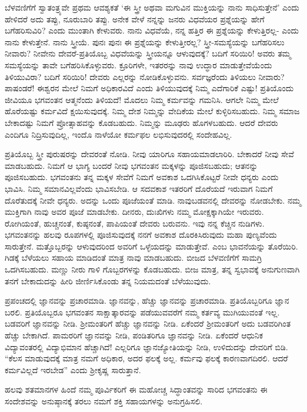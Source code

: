 ಬೆಳವಣಿಗೆಗೆ ಸ್ವಾತಂತ್ರ್ಯವೇ ಪ್ರಥಮ ಆವಶ್ಯಕತೆ ‘ಈ ಸ್ತ್ರೀ ಅಥವಾ ಮಗುವಿನ ಮುಕ್ತಿಯನ್ನು ನಾನು ಸಾಧಿಸುತ್ತೇನೆ’ ಎಂದು ಹೇಳಿದರೆ ಅದು ತಪ್ಪು, ನೂರುಬಾರಿ ತಪ್ಪು. ಅನೇಕ ವೇಳೆ ನನ್ನನ್ನು ಜನರು ವಿಧವೆಯರ ಪ್ರಶ್ನೆಯನ್ನು ಹೇಗೆ ಬಗೆಹರಿಸುವಿರಿ? ಎಂದು ಮುಂತಾಗಿ ಕೇಳುವರು. ನಾನು ವಿಧವೆಯೆ, ನನ್ನ ಹತ್ತಿರ ಈ ಪ್ರಶ್ನೆಯನ್ನು ಕೇಳುತ್ತಿರಲ್ಲ- ಎಂದು ನಾನು ಕೇಳುತ್ತೇನೆ. ನಾನು ಸ್ತ್ರೀಯೆ. ಪುನಃ ಪುನಃ ಈ ಪ್ರಶ್ನೆಯನ್ನು ಕೇಳುತ್ತೀರಲ್ಲ? ಸ್ತ್ರೀ-ಸಮಸ್ಯೆಯನ್ನು ಬಗೆಹರಿಸಲು ನೀವಾರು? ನೀವೇನು ದೇವರೆ-ಪ್ರತಿಯೊಬ್ಬ ವಿಧವೆಯನ್ನು ಸ್ತ್ರೀಯನ್ನೂ ಆಳುವುದಕ್ಕೆ? ಬದಿಗೆ ಸರಿಯಿರಿ! ಅವರು ತಮ್ಮ ಸಮಸ್ಯೆಯನ್ನು ತಾವೇ ಬಗೆಹರಿಸಿಕೊಳ್ಳುವರು. ಕ್ರೂರಿಗಳೇ, ಇತರರನ್ನು ನಾವು ಉದ್ಧಾರ ಮಾಡುತ್ತೇವೆಯೆಂದು ತಿಳಿಯುವಿರಾ? ಬದಿಗೆ ಸರಿಯಿರಿ! ದೇವರು ಎಲ್ಲರನ್ನು ನೋಡಿಕೊಳ್ಳುವನು. ಸರ್ವಜ್ಞರೆಂದು ತಿಳಿಯಲು ನೀವಾರು? ಪಾಷಂಡರೆ! ಈಶ್ವರನ ಮೇಲೆ ನಿಮಗೆ ಅಧಿಕಾರವಿದೆ ಎಂದು ತಿಳಿಯುವುದಕ್ಕೆ ನಿಮ್ಮ ಎದೆಗಾರಿಕೆ ಎಷ್ಟು! ಪ್ರತಿಯೊಂದು ಜೀವಿಯೂ ಭಗವಂತನ ಆತ್ಮನೆಂದು ತಿಳಿಯದೆ! ಮೊದಲು ನಿಮ್ಮ ಕರ್ಮವನ್ನು ಗಮನಿಸಿ. ಆಗಲೇ ನಿಮ್ಮ ಮೇಲೆ ಹೊರೆಯಷ್ಟು ಕರ್ಮವಿದೆ ಕ್ಷಯಿಸುವುದಕ್ಕೆ. ನಿಮ್ಮ ದೇಶ ನಿಮ್ಮನ್ನು ವೇದಿಕೆಯ ಮೇಲೆ ಕುಳ್ಳಿರಿಸಬಹುದು. ನಿಮ್ಮ ಸಮಾಜ ಬೇಕಾದಷ್ಟು ನಿಮಗೆ ಪ್ರೋತ್ಸಾಹವನ್ನು ಕೊಡಬಹುದು. ನಿಮ್ಮನ್ನು ಮೂಢರು ಹೊಗಳಬಹುದು. ಆದರೆ ದೇವರು ಎಂದಿಗೂ ನಿದ್ರಿಸುವುದಿಲ್ಲ, ಇಂದೊ ನಾಳೆಯೋ ಕರ್ಮಫಲ ಲಭಿಸುವುದರಲ್ಲಿ ಸಂದೇಹವಿಲ್ಲ.

ಪ್ರತಿಯೊಬ್ಬ ಸ್ತ್ರೀ ಪುರುಷರನ್ನು ದೇವರಂತೆ ನೋಡಿ. ನೀವು ಯಾರಿಗೂ ಸಹಾಯಮಾಡಲಾರಿರಿ. ಬೇಕಾದರೆ ನೀವು ಸೇವೆ ಮಾಡಬಹುದು. ನಿಮಗೆ ಆ ಭಾಗ್ಯ ಬಂದರೆ ನೀವು ಭಗವಂತನ ಮಕ್ಕಳನ್ನು ಪೂಜಿಸಬಹುದು; ಆತನನ್ನು ಪೂಜಿಸಬಹುದು. ಭಗವಂತನು ತನ್ನ ಮಕ್ಕಳ ಸೇವೆಗೆ ನಿಮಗೆ ಅವಕಾಶ ಒದಗಿಸಿಕೊಟ್ಟರೆ ನೀವೇ ಧನ್ಯರು ಎಂದು ಭಾವಿಸಿ. ನಿಮ್ಮ ಸಮಾನವಿಲ್ಲವೆಂದು ಭಾವಿಸಬೇಡಿ. ಆ ಸದವಕಾಶ ಇತರರಿಗೆ ದೊರೆಯದೆ ಇರುವಾಗ ನಿಮಗೆ ದೊರೆತುದಕ್ಕೆ ನೀವೇ ಧನ್ಯರು. ಅದನ್ನು ಒಂದು ಪೂಜೆಯಂತೆ ಮಾಡಿ. ನಾವು\break ಬಡವನಲ್ಲಿ ದೇವರನ್ನು ನೋಡಬೇಕು. ನಮ್ಮ ಮುಕ್ತಿಗಾಗಿ ನಾವು ಅವರ ಪೂಜೆ ಮಾಡಬೇಕು. ದೀನರು, ದುಃಖಿಗಳು ನಮ್ಮ ಮೋಕ್ಷಕ್ಕಾಗಿಯೇ ಇರುವರು. ರೋಗಿಯಂತೆ, ಹುಚ್ಚನಂತೆ, ಕುಷ್ಠನಂತೆ, ಪಾಪಿಯಂತೆ ದೇವರು ಬರುವನು. ಇವು ನನ್ನ ಕೆಚ್ಚಿನ ನುಡಿಗಳು. ಭಗವಂತನನ್ನು ಹಲವು ರೂಪಗಳಲ್ಲಿ ಪೂಜಿಸುವುದಕ್ಕೆ ನನಗೆ ಅವಕಾಶ ದೊರಕಿಸಿರುವುದು ಮಹಾ ಪುಣ್ಯವೆಂದು ಸಾರುತ್ತೇನೆ. ಮತ್ತೊಬ್ಬರನ್ನು ಆಳುವುದರಿಂದ ಅವರಿಗೆ ಒಳ್ಳೆಯದನ್ನು ಮಾಡುತ್ತೇವೆ. ಎಂಬ ಭಾವನೆಯನ್ನು ತೊರೆಯಿರಿ. ಗಿಡಕ್ಕೆ ಬೆಳೆಯಲು ಸಹಾಯ ಮಾಡಿದಂತೆ ಮಾತ್ರ ನಾವು ಮಾಡಬಹುದು. ಬೀಜದ ಬೆಳವಣಿಗೆಗೆ ಸಾಮಗ್ರಿ ಒದಗಿಸಬಹುದು. ಮಣ್ಣು ನೀರು ಗಾಳಿ ಗೊಬ್ಬರಗಳನ್ನು ಕೊಡಬಹುದು. ಬೀಜ ಮಾತ್ರ, ತನ್ನ ಸ್ವಭಾವಕ್ಕೆ ಅನುಗುಣವಾಗಿ ತನಗೆ ಬೇಕಾದುದನ್ನು ಹೀರಿ ಜೀರ್ಣಿಸಿಕೊಂಡು ತನ್ನ ನಿಯಮದಂತೆ ಬೆಳೆಯುವುದು.

ಪ್ರಪಂಚದಲ್ಲಿ ಜ್ಞಾನವನ್ನು ಪ್ರಚಾರಮಾಡಿ. ಜ್ಞಾನವನ್ನು, ಹೆಚ್ಚು ಜ್ಞಾನವನ್ನು ಪ್ರಚಾರಮಾಡಿ. ಪ್ರತಿಯೊಬ್ಬರಿಗೂ ಜ್ಞಾನ ಬರಲಿ. ಪ್ರತಿಯೊಬ್ಬರೂ ಭಗವಂತನ ಸಾಕ್ಷಾತ್ಕಾರವನ್ನು ಪಡೆಯುವವರೆಗೆ ನಮ್ಮ ಕರ್ತವ್ಯ ಮುಗಿಯುವಂತೆ ಇಲ್ಲ. ಬಡವರಿಗೆ ಜ್ಞಾನವನ್ನು ನೀಡಿ. ಶ‍್ರೀಮಂತರಿಗೆ ಹೆಚ್ಚು ಜ್ಞಾನವನ್ನು ನೀಡಿ. ಏಕೆಂದರೆ ಶ‍್ರೀಮಂತರಿಗೆ ಅದು ಬಡವರಿ\-ಗಿಂತ ಹೆಚ್ಚು ಬೇಕಾಗಿದೆ. ಪಾಮರರಿಗೆ ಜ್ಞಾನವನ್ನು ನೀಡಿ, ಪಂಡಿತರಿಗೂ ಜ್ಞಾನವನ್ನು ನೀಡಿ. ಏಕೆಂದರೆ ಆಧುನಿಕ ವಿದ್ಯಾವಂತರಲ್ಲಿ ವಿದ್ಯಾಭಿಮಾನ ಹೆಚ್ಚಾಗಿದೆ! ಎಲ್ಲರಿಗೂ ಜ್ಞಾನಜ್ಯೋತಿಯನ್ನು ನೀಡಿ, ಉಳಿದುದನ್ನು ದೇವರಿಗೆ ಬಿಡಿ. “ಕೆಲಸ ಮಾಡುವುದಕ್ಕೆ ಮಾತ್ರ ನಮಗೆ ಅಧಿಕಾರ, ಅದರ ಫಲಕ್ಕೆ ಅಲ್ಲ. ಕರ್ಮವು ಫಲಕ್ಕೆ ಕಾರಣವಾಗದಿರಲಿ. ಆದರೆ ಕರ್ಮವಿಲ್ಲದೆ ಇರಬೇಡ” ಎಂದು ಶ‍್ರೀಕೃಷ್ಣ ಸಾರುತ್ತಾನೆ.

ಹಲವು ಶತಮಾನಗಳ ಹಿಂದೆ ನಮ್ಮ ಪೂರ್ವಿಕರಿಗೆ ಈ ಮಹೋಚ್ಚ ಸಿದ್ಧಾಂತವನ್ನು ಸಾರಿದ ಭಗವಂತನು ಈ ಸಂದೇಶವನ್ನು ಅನುಷ್ಠಾನಕ್ಕೆ ತರಲು ನಮಗೆ ಶಕ್ತಿ ಸಹಾಯಗಳನ್ನು ಅನುಗ್ರಹಿಸಲಿ.

